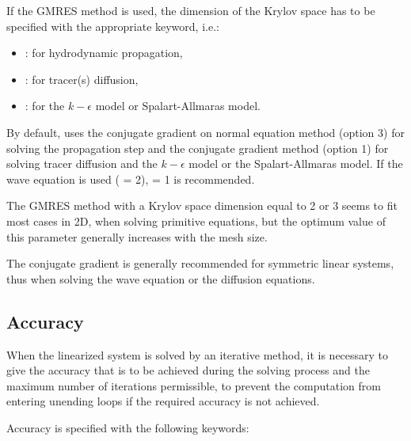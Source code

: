 If the GMRES method is used, the dimension of the Krylov space has to be
specified with the appropriate keyword, i.e.:

\begin{itemize}
\item {}: for hydrodynamic propagation,

\item {}: for tracer(s) diffusion,

\item {}:
for the $k-\epsilon$ model or Spalart-Allmaras model.
\end{itemize}

By default,  uses the conjugate gradient on normal equation method
(option 3) for solving the propagation step
and the conjugate gradient method (option 1) for solving tracer diffusion and
the $k-\epsilon$ model or the Spalart-Allmaras model.
If the wave equation is used ( = 2),
 = 1 is recommended.

The GMRES method with a Krylov space dimension equal to 2 or 3 seems
to fit most cases in 2D, when solving primitive equations,
but the optimum value of this parameter generally increases with the mesh size.

The conjugate gradient is generally recommended for symmetric linear systems,
thus when solving the wave equation or the diffusion equations.


\subsection{Accuracy}

When the linearized system is solved by an iterative method, it is necessary
to give the accuracy that is to be achieved during the solving process and
the maximum number of iterations permissible, to prevent the computation
from entering unending loops if the required accuracy is not achieved.

Accuracy is specified with the following keywords:

